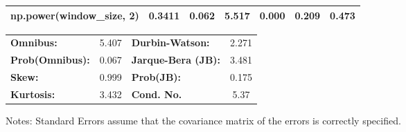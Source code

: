\begin{center}
\begin{tabular}{lcccccc}
\textbf{np.power(window\_size, 2)}            &       0.3411  &        0.062     &     5.517  &         0.000        &        0.209    &        0.473     \\
\bottomrule
\end{tabular}
\begin{tabular}{lclc}
\textbf{Omnibus:}       &  5.407 & \textbf{  Durbin-Watson:     } &    2.271  \\
\textbf{Prob(Omnibus):} &  0.067 & \textbf{  Jarque-Bera (JB):  } &    3.481  \\
\textbf{Skew:}          &  0.999 & \textbf{  Prob(JB):          } &    0.175  \\
\textbf{Kurtosis:}      &  3.432 & \textbf{  Cond. No.          } &     5.37  \\
\bottomrule
\end{tabular}
\end{center}

Notes: \newline
 [1] Standard Errors assume that the covariance matrix of the errors is correctly specified.